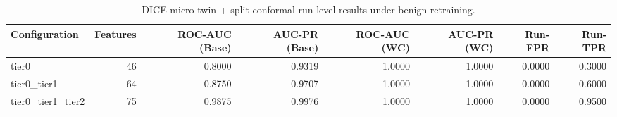 \begin{table}[t]
\centering
\caption{DICE micro-twin + split-conformal run-level results under benign retraining.}
\label{tab:dice_full_overall}
\footnotesize
\begin{tabular}{lrrrrrrr}
\toprule
Configuration & Features & ROC-AUC (Base) & AUC-PR (Base) & ROC-AUC (WC) & AUC-PR (WC) & Run-FPR & Run-TPR \\
\midrule
tier0 & 46 & 0.8000 & 0.9319 & 1.0000 & 1.0000 & 0.0000 & 0.3000 \\
tier0_tier1 & 64 & 0.8750 & 0.9707 & 1.0000 & 1.0000 & 0.0000 & 0.6000 \\
tier0_tier1_tier2 & 75 & 0.9875 & 0.9976 & 1.0000 & 1.0000 & 0.0000 & 0.9500 \\
\bottomrule
\end{tabular}

\end{table}
